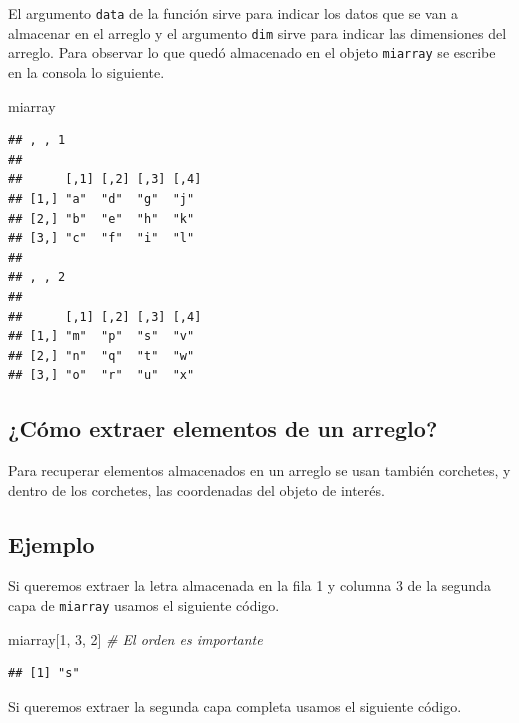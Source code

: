 \documentclass[10pt,]{krantz}
\makeatletter
\newenvironment{Shaded}{\begin{snugshade}}{\end{snugshade}}
\newcommand{\DecValTok}[1]{\textcolor[rgb]{0.00,0.00,0.81}{#1}}
\newcommand{\CommentTok}[1]{\textcolor[rgb]{0.56,0.35,0.01}{\textit{#1}}}
\newcommand{\NormalTok}[1]{#1}
\newenvironment{kframe}{%
\medskip{}
\setlength{\fboxsep}{.8em}
 \def\at@end@of@kframe{}%
 \ifinner\ifhmode%
  \def\at@end@of@kframe{\end{minipage}}%
  \begin{minipage}{\columnwidth}%
 \fi\fi%
 \def\FrameCommand##1{\hskip\@totalleftmargin \hskip-\fboxsep
 \colorbox{shadecolor}{##1}\hskip-\fboxsep
     \hskip-\linewidth \hskip-\@totalleftmargin \hskip\columnwidth}%
 \MakeFramed {\advance\hsize-\width
   \@totalleftmargin\z@ \linewidth\hsize
   \@setminipage}}%
 {\par\unskip\endMakeFramed%
 \at@end@of@kframe}
\renewenvironment{Shaded}{\begin{kframe}}{\end{kframe}}
\makeatother
\begin{document}
El argumento \texttt{data} de la función sirve para indicar los datos
que se van a almacenar en el arreglo y el argumento \texttt{dim} sirve
para indicar las dimensiones del arreglo. Para observar lo que quedó
almacenado en el objeto \texttt{miarray} se escribe en la consola lo
siguiente.

\begin{Shaded}
\begin{Highlighting}[]
\NormalTok{miarray}
\end{Highlighting}
\end{Shaded}

\begin{verbatim}
## , , 1
## 
##      [,1] [,2] [,3] [,4]
## [1,] "a"  "d"  "g"  "j" 
## [2,] "b"  "e"  "h"  "k" 
## [3,] "c"  "f"  "i"  "l" 
## 
## , , 2
## 
##      [,1] [,2] [,3] [,4]
## [1,] "m"  "p"  "s"  "v" 
## [2,] "n"  "q"  "t"  "w" 
## [3,] "o"  "r"  "u"  "x"
\end{verbatim}

\subsection{¿Cómo extraer elementos de un
arreglo?}\label{como-extraer-elementos-de-un-arreglo}

Para recuperar elementos almacenados en un arreglo se usan también
corchetes, y dentro de los corchetes, las coordenadas del objeto de
interés.

\subsection*{Ejemplo}\label{ejemplo-2}


Si queremos extraer la letra almacenada en la fila 1 y columna 3 de la
segunda capa de \texttt{miarray} usamos el siguiente código.

\begin{Shaded}
\begin{Highlighting}[]
\NormalTok{miarray[}\DecValTok{1}\NormalTok{, }\DecValTok{3}\NormalTok{, }\DecValTok{2}\NormalTok{]  }\CommentTok{# El orden es importante}
\end{Highlighting}
\end{Shaded}

\begin{verbatim}
## [1] "s"
\end{verbatim}

Si queremos extraer la segunda capa completa usamos el siguiente código.
\end{document}
